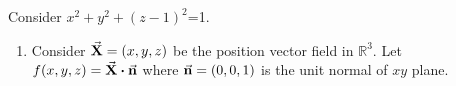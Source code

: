 \begin{example}
    Consider $x^2+y^2+(z-1)^2$=1.
    \begin{enumerate}[(1)]
        \item  Consider $\va{X}=(x,y,z)$ be the position vector field in
              $\mathbb{R}^3$. Let $f(x,y,z)=\va{X}\vdot \va{n}$
              where $\va{n}=(0,0,1)$ is the unit normal of $xy$
              plane.
              \begin{center}




                  \begin{tikzpicture}[x=0.75pt,y=0.75pt,yscale=-1,xscale=1]


\end{tikzpicture}
\end{center}
\end{enumerate}
\end{example}
